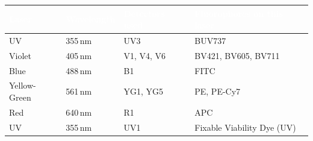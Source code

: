 \vspace{4pt}
\begin{center}
\renewcommand{\arraystretch}{1.15}
\begin{tabularx}{\linewidth}{@{}C{1.5cm}C{2.15cm}C{1.85cm}X@{}}
\toprule
{}
\textcolor{white}{\textbf{Laser}} & \textcolor{white}{\textbf{Wavelength}} &
\textcolor{white}{\textbf{Detectors used}} & \textcolor{white}{\textbf{Fluorophores on this laser}} \\
\midrule
UV & 355\,nm & UV3 & BUV737 \\
Violet & 405\,nm & V1, V4, V6 & BV421, BV605, BV711 \\
Blue & 488\,nm & B1 & FITC \\
Yellow-Green & 561\,nm & YG1, YG5 & PE, PE-Cy7 \\
Red & 640\,nm & R1 & APC \\
UV & 355\,nm & UV1 & Fixable Viability Dye (UV) \\
\bottomrule
\end{tabularx}
\end{center}
